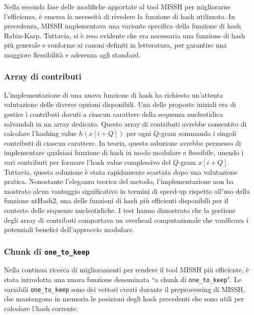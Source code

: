 Nella seconda fase delle modifiche apportate al tool \acs{MISSH} per migliorarne l'efficienza, è emersa la necessità di rivedere la funzione di hash utilizzata. In precedenza, \acs{MISSH} implementava una variante specifica della funzione di hash Rabin-Karp. Tuttavia, si è reso evidente che era necessaria una funzione di hash più generale e conforme ai canoni definiti in letteratura, per garantire una maggiore flessibilità e aderenza agli standard.

\subsubsection*{Array di contributi}
L'implementazione di una nuova funzione di hash ha richiesto un'attenta valutazione delle diverse opzioni disponibili. Una delle proposte iniziali era di gestire i contributi dovuti a ciascun carattere della sequenza nucleotidica salvandoli in un array dedicato. Questo array di contributi avrebbe consentito di calcolare l'hashing value $h(x[i + Q])$ per ogni $Q$-gram sommando i singoli contributi di ciascun carattere. In teoria, questa soluzione avrebbe permesso di implementare qualsiasi funzione di hash in modo modulare e flessibile, unendo i vari contributi per formare l'hash value complessivo del $Q$-gram $x[i + Q]$. Tuttavia, questa soluzione è stata rapidamente scartata dopo una valutazione pratica. Nonostante l'eleganza teorica del metodo, l'implementazione non ha mostrato alcun vantaggio significativo in termini di speed-up rispetto all'uso della funzione ntHash2, una delle funzioni di hash più efficienti disponibili per il contesto delle sequenze nucleotidiche. I test hanno dimostrato che la gestione degli array di contributi comportava un overhead computazionale che vanificava i potenziali benefici dell'approccio modulare.


\subsubsection*{Chunk di \texttt{one\_to\_keep}}
Nella continua ricerca di miglioramenti per rendere il tool MISSH più efficiente, è stata introdotta una nuova funzione denominata “a chunk di \verb|one_to_keep|". Le variabili \verb|one_to_keep| sono dei vettori creati durante il preprocessing di MISSH, che mantengono in memoria le posizioni degli hash precedenti che sono utili per calcolare l'hash corrente.

